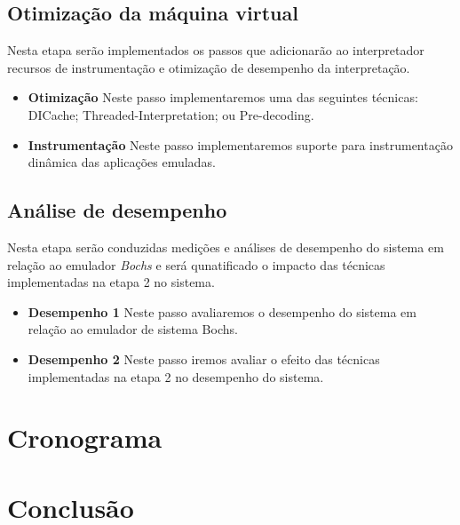 \documentclass[11pt,twoside]{article}
\begin{document}
\subsection{Otimização da máquina virtual}

Nesta etapa serão implementados os passos que adicionarão ao interpretador recursos de instrumentação e otimização de desempenho da interpretação.

\begin{itemize}
 \item \textbf{Otimização} Neste passo implementaremos uma das seguintes técnicas: DICache; Threaded-Interpretation; ou Pre-decoding.
 \item \textbf{Instrumentação} Neste passo implementaremos suporte para instrumentação dinâmica das aplicações emuladas.
\end{itemize}
 
\subsection{Análise de desempenho}

Nesta etapa serão conduzidas medições e análises de desempenho do sistema em relação ao emulador \emph{Bochs} e será qunatificado o impacto das técnicas implementadas na etapa 2 no sistema.

\begin{itemize}
 \item \textbf{Desempenho 1} Neste passo avaliaremos o desempenho do sistema em relação ao emulador de sistema Bochs.
 \item \textbf{Desempenho 2} Neste passo iremos avaliar o efeito das técnicas implementadas na etapa 2 no desempenho do sistema.
\end{itemize}

\section{Cronograma}


\section{Conclusão}


\end{document}
